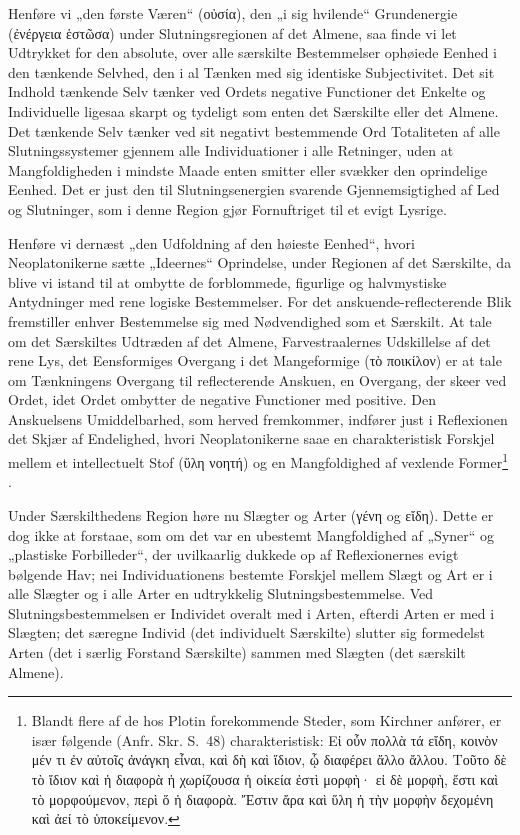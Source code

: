 \documentclass[12pt]{book}
\newcommand{\opage}[1]{\marginnote{\footnotesize\textit{[#1]}}}
\begin{document}
Henføre vi „den første Væren“ (οὐσία), den „i sig hvilende“ Grundenergie (ἐνέργεια ἑστῶσα) under Slutningsregionen af det Almene, saa finde vi let Udtrykket for den absolute, over alle særskilte Bestemmelser ophøiede Eenhed i den tænkende Selvhed, den i al Tænken med sig identiske Subjectivitet. Det sit Indhold tænkende Selv tænker ved Ordets negative Functioner det Enkelte og Individuelle ligesaa skarpt og tydeligt som enten det Særskilte eller det Almene. Det tænkende Selv tænker ved sit negativt bestemmende Ord Totaliteten af alle Slutningssystemer gjennem alle Individuationer i alle Retninger, uden at Mangfoldigheden i mindste Maade enten smitter eller svækker den oprindelige Eenhed. Det er just den til Slutningsenergien svarende Gjennemsigtighed af Led og Slutninger, som i denne Region gjør Fornuftriget til et evigt Lysrige.

Henføre vi dernæst „den Udfoldning af den høieste Eenhed“, hvori Neoplatonikerne sætte „Ideernes“ Oprindelse, under Regionen af det Særskilte, da blive vi istand til at ombytte de forblommede, figurlige og halvmystiske Antydninger med rene logiske Bestemmelser. For det anskuende-reflecterende Blik fremstiller enhver Bestemmelse sig med Nødvendighed
\opage{360}som et Særskilt. At tale om det Særskiltes Udtræden af det Almene, Farvestraalernes Udskillelse af det rene Lys, det Eensformiges Overgang i det Mangeformige (τὸ ποικίλον) er at tale om Tænkningens Overgang til reflecterende Anskuen, en Overgang, der skeer ved Ordet, idet Ordet ombytter de negative Functioner med positive. Den Anskuelsens Umiddelbarhed, som herved fremkommer, indfører just i Reflexionen det Skjær af Endelighed, hvori Neoplatonikerne saae en charakteristisk Forskjel mellem et intellectuelt Stof (ὕλη νοητή) og en Mangfoldighed af vexlende Former\footnote{Blandt flere af de hos Plotin forekommende Steder, som Kirchner anfører, er især følgende (Anfr. Skr. S.~48) charakteristisk: Εἰ οὖν πολλὰ τά εἴδη, κοινὸν μέν τι ἐν αὐτοῖς ἀνάγκη εἶναι, καὶ δὴ καὶ ἴδιον, ᾧ διαφέρει ἄλλο ἄλλου. %
Τοῦτο δὲ τὸ ἴδιον καὶ ἡ διαφορὰ ἡ χωρίζουσα ἡ οἰκεία ἐστὶ μορφὴ· εἰ δὲ μορφὴ, ἔστι καὶ τὸ μορφούμενον, περὶ ὅ ἡ διαφορὰ. Ἔστιν ἄρα καὶ ὕλη ἡ τὴν μορφὴν δεχομένη καὶ ἀεί τὸ ὑποκείμενον.}%
. %

Under Særskilthedens Region høre nu Slægter og Arter (γένη og εἴδη). Dette er dog ikke at forstaae, som om det var en ubestemt Mangfoldighed af „Syner“ og „plastiske Forbilleder“, der uvilkaarlig dukkede op af Reflexionernes evigt bølgende Hav; nei Individuationens bestemte Forskjel mellem Slægt og Art er i alle Slægter og i alle Arter en udtrykkelig Slutningsbestemmelse. Ved Slutningsbestemmelsen er Individet overalt med i Arten, efterdi Arten er med i Slægten; det særegne Individ (det individuelt Særskilte) slutter sig formedelst Arten (det i særlig Forstand Særskilte) sammen med Slægten (det særskilt Almene).
\end{document}
